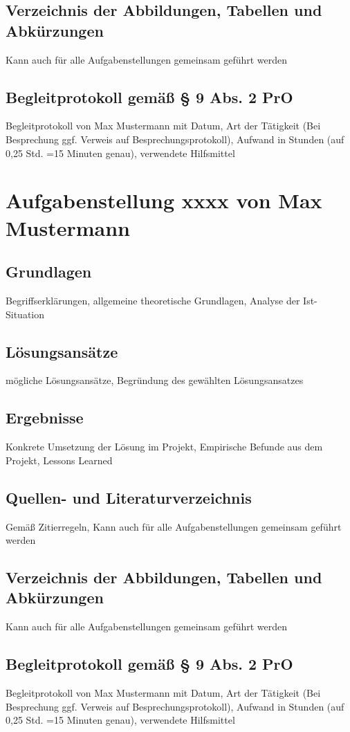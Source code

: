 \documentclass[letterpaper,10pt]{article}
\begin{document}
\subsection{Verzeichnis der Abbildungen, Tabellen und Abkürzungen}
Kann auch für alle Aufgabenstellungen gemeinsam geführt werden
\subsection{Begleitprotokoll gemäß § 9 Abs. 2 PrO}
Begleitprotokoll von Max Mustermann mit Datum, Art der Tätigkeit (Bei Besprechung ggf. Verweis auf Besprechungsprotokoll), Aufwand in Stunden (auf 0,25 Std. =15 Minuten genau), verwendete Hilfsmittel

\pagebreak

\section{Aufgabenstellung xxxx von Max Mustermann}
\subsection{Grundlagen}
Begriffserklärungen, allgemeine theoretische Grundlagen, Analyse der Ist-Situation
\subsection{Lösungsansätze}
mögliche Lösungsansätze, Begründung des gewählten Lösungsansatzes
\subsection{Ergebnisse}
Konkrete Umsetzung der Lösung im Projekt, Empirische Befunde aus dem Projekt, Lessons Learned
\subsection{Quellen- und Literaturverzeichnis}
Gemäß Zitierregeln, Kann auch für alle Aufgabenstellungen gemeinsam geführt werden
\subsection{Verzeichnis der Abbildungen, Tabellen und Abkürzungen}
Kann auch für alle Aufgabenstellungen gemeinsam geführt werden
\subsection{Begleitprotokoll gemäß § 9 Abs. 2 PrO}
Begleitprotokoll von Max Mustermann mit Datum, Art der Tätigkeit (Bei Besprechung ggf. Verweis auf Besprechungsprotokoll), Aufwand in Stunden (auf 0,25 Std. =15 Minuten genau), verwendete Hilfsmittel
\end{document}
